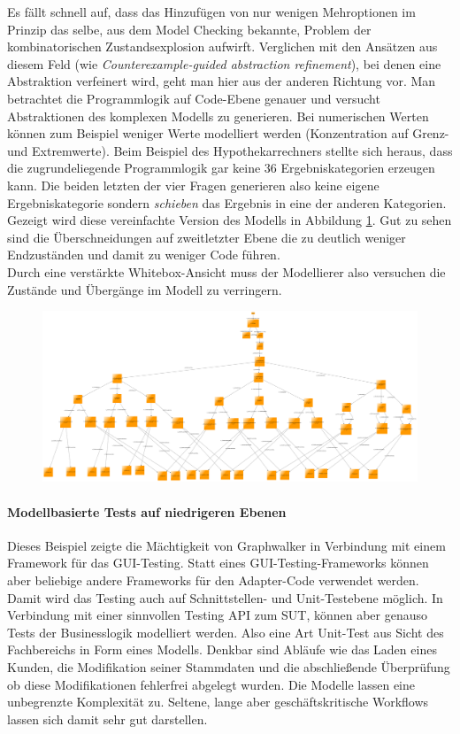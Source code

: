 Es fällt schnell auf, dass das Hinzufügen von nur wenigen Mehroptionen im Prinzip das selbe, aus dem Model Checking bekannte, Problem der kombinatorischen Zustandsexplosion aufwirft\cite{clarke_model_2012}. Verglichen mit den Ansätzen aus diesem Feld (wie \textit{Counterexample-guided abstraction refinement}\cite{clarke_counterexample-guided_2000}), bei denen eine Abstraktion verfeinert wird, geht man hier aus der anderen Richtung vor. Man betrachtet die Programmlogik auf Code-Ebene genauer und versucht Abstraktionen des komplexen Modells zu generieren. Bei numerischen Werten können zum Beispiel weniger Werte modelliert werden (Konzentration auf Grenz- und Extremwerte). Beim Beispiel des Hypothekarrechners stellte sich heraus, dass die zugrundeliegende Programmlogik gar keine 36 Ergebniskategorien erzeugen kann. Die beiden letzten der vier Fragen generieren also keine eigene Ergebniskategorie sondern \textit{schieben} das Ergebnis in eine der anderen Kategorien. Gezeigt wird diese vereinfachte Version des Modells in Abbildung \ref{fig:modell_logisch}. Gut zu sehen sind die Überschneidungen auf zweitletzter Ebene die zu deutlich weniger Endzuständen und damit zu weniger Code führen.\\
Durch eine verstärkte Whitebox-Ansicht muss der Modellierer also versuchen die  Zustände und Übergänge im Modell zu verringern.


\begin{figure}[h] 
  \centering
     \includegraphics[width=1.5\textwidth, angle=90]{figures/modell_logisch.png}
  \caption{}
  \label{fig:modell_logisch}
\end{figure}

\paragraph{Modellbasierte Tests auf niedrigeren Ebenen} Dieses Beispiel zeigte die Mächtigkeit von Graphwalker in Verbindung mit einem Framework für das GUI-Testing. Statt eines GUI-Testing-Frameworks können aber beliebige andere Frameworks für den Adapter-Code verwendet werden. Damit wird das Testing auch auf Schnittstellen- und Unit-Testebene möglich. In Verbindung mit einer sinnvollen Testing API zum SUT, können aber genauso Tests der Businesslogik modelliert werden. Also eine Art Unit-Test aus Sicht des Fachbereichs in Form eines Modells. Denkbar sind Abläufe wie das Laden eines Kunden, die Modifikation seiner Stammdaten und die abschließende Überprüfung ob diese Modifikationen fehlerfrei abgelegt wurden. Die Modelle lassen eine unbegrenzte Komplexität zu. Seltene, lange aber geschäftskritische Workflows lassen sich damit sehr gut darstellen.

